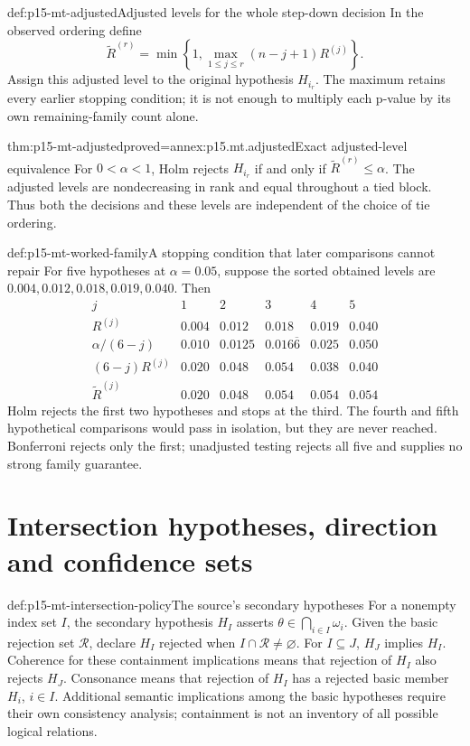 \begin{hbdefinition}{def:p15-mt-adjusted}{Adjusted levels for the whole step-down decision}
In the observed ordering define
\[
 \widetilde R^{(r)}
  =\min\left\{1,\max_{1\leq j\leq r}(n-j+1)R^{(j)}\right\}.
\]
Assign this adjusted level to the original hypothesis \(H_{i_r}\).
The maximum retains every earlier stopping condition; it is not enough
to multiply each p-value by its own remaining-family count alone.
\end{hbdefinition}

\begin{hblemma}{thm:p15-mt-adjusted}{proved=annex:p15.mt.adjusted}{Exact adjusted-level equivalence}
For \(0<\alpha<1\), Holm rejects \(H_{i_r}\) if and only if
\(\widetilde R^{(r)}\leq\alpha\). The adjusted levels are nondecreasing
in rank and equal throughout a tied block. Thus both the decisions and
these levels are independent of the choice of tie ordering.
\end{hblemma}

\begin{hbexample}{def:p15-mt-worked-family}{A stopping condition that later comparisons cannot repair}
For five hypotheses at \(\alpha=0.05\), suppose the sorted obtained levels
are \(0.004,0.012,0.018,0.019,0.040\). Then
\[
\begin{array}{c|ccccc}
 j&1&2&3&4&5\\ \hline
 R^{(j)}&0.004&0.012&0.018&0.019&0.040\\
 \alpha/(6-j)&0.010&0.0125&0.016\overline6&0.025&0.050\\
 (6-j)R^{(j)}&0.020&0.048&0.054&0.038&0.040\\
 \widetilde R^{(j)}&0.020&0.048&0.054&0.054&0.054
\end{array}
\]
Holm rejects the first two hypotheses and stops at the third. The fourth
and fifth hypothetical comparisons would pass in isolation, but they
are never reached. Bonferroni rejects only the first; unadjusted testing
rejects all five and supplies no strong family guarantee.
\end{hbexample}

\section{Intersection hypotheses, direction and confidence sets}
\label{sec:p15-mt-logical-structure}

\begin{hbdefinition}{def:p15-mt-intersection-policy}{The source's secondary hypotheses}
For a nonempty index set \(I\), the secondary hypothesis \(H_I\) asserts
\(\theta\in\bigcap_{i\in I}\omega_i\).
Given the basic rejection set \(\mathcal R\), declare \(H_I\) rejected
when \(I\cap\mathcal R\ne\varnothing\).
For \(I\subseteq J\), \(H_J\) implies \(H_I\).
Coherence for these containment implications means that rejection of
\(H_I\) also rejects \(H_J\). Consonance means that rejection of \(H_I\)
has a rejected basic member \(H_i\), \(i\in I\).
Additional semantic implications among the basic hypotheses require
their own consistency analysis; containment is not an inventory of all
possible logical relations.
\end{hbdefinition}


